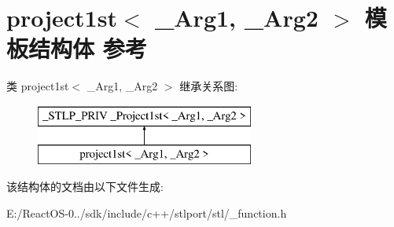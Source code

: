 \hypertarget{structproject1st}{}\section{project1st$<$ \+\_\+\+Arg1, \+\_\+\+Arg2 $>$ 模板结构体 参考}
\label{structproject1st}
类 project1st$<$ \+\_\+\+Arg1, \+\_\+\+Arg2 $>$ 继承关系图\+:\begin{figure}[H]
\begin{center}
\leavevmode
\includegraphics[height=2.000000cm]{structproject1st}
\end{center}
\end{figure}


该结构体的文档由以下文件生成\+:\begin{DoxyCompactItemize}
\item 
E\+:/\+React\+O\+S-\/0../sdk/include/c++/stlport/stl/\+\_\+function.\+h\end{DoxyCompactItemize}
